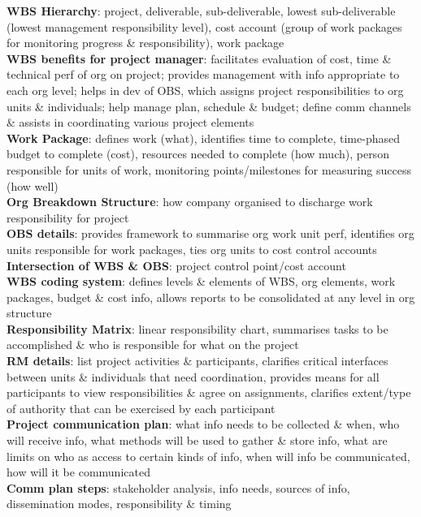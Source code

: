 \documentclass[a4paper]{article}
\begin{document}
\begin{multicols}{3}
        \textbf{WBS Hierarchy}: project, deliverable, sub-deliverable, lowest sub-deliverable (lowest management responsibility level), cost account (group of work packages for monitoring progress \& responsibility), work package\\
        \textbf{WBS benefits for project manager}: facilitates evaluation of cost, time \& technical perf of org on project; provides management with info appropriate to each org level; helps in dev of OBS, which assigns project responsibilities to org units \& individuals; help manage plan, schedule \& budget; define comm channels \& assists in coordinating various project elements\\
        \textbf{Work Package}: defines work (what), identifies time to complete, time-phased budget to complete (cost), resources needed to complete (how much), person responsible for units of work, monitoring points/milestones for measuring success (how well)\\
        \textbf{Org Breakdown Structure}: how company organised to discharge work responsibility for project\\
        \textbf{OBS details}: provides framework to summarise org work unit perf, identifies org units responsible for work packages, ties org units to cost control accounts\\
        \textbf{Intersection of WBS \& OBS}: project control point/cost account\\
        \textbf{WBS coding system}: defines levels \& elements of WBS, org elements, work packages, budget \& cost info, allows reports to be consolidated at any level in org structure\\
        \textbf{Responsibility Matrix}: linear responsibility chart, summarises tasks to be accomplished \& who is responsible for what on the project\\
        \textbf{RM details}: list project activities \& participants, clarifies critical interfaces between units \& individuals that need coordination, provides means for all participants to view responsibilities \& agree on assignments, clarifies extent/type of authority that can be exercised by each participant\\
        \textbf{Project communication plan}: what info needs to be collected \& when, who will receive info, what methods will be used to gather \& store info, what are limits on who as access to certain kinds of info, when will info be communicated, how will it be communicated\\
        \textbf{Comm plan steps}: stakeholder analysis, info needs, sources of info, dissemination modes, responsibility \& timing\\

\end{multicols}
\end{document}
